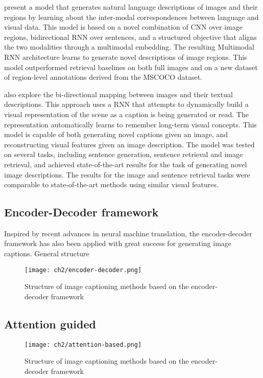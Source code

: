 \citet{Karpathy2015} present a model that generates natural language descriptions of images and their regions by learning about the inter-modal correspondences between language and visual data. This model is based on a novel combination of CNN over image regions, bidirectional RNN over sentences, and a structured objective that aligns the two modalities through a multimodal embedding. The resulting Multimodal RNN architecture learns to generate novel descriptions of image regions. This model outperformed retrieval baselines on both full images and on a new dataset of region-level annotations derived from the MSCOCO dataset.
 
\citet{Chen2015} also explore the bi-directional mapping between images and their textual descriptions. This approach uses a RNN that attempts to dynamically build a visual representation of the scene as a caption is being generated or read. The representation automatically learns to remember long-term visual concepts. This model is capable of both generating novel captions given an image, and reconstructing visual features given an image description. The model was tested on several tasks, including sentence generation, sentence retrieval and image retrieval, and achieved state-of-the-art results for the task of generating novel image descriptions. The results for the image and sentence retrieval tasks were comparable to state-of-the-art methods using similar visual features.

\subsection{Encoder-Decoder framework}

Inspired by recent advances in neural machine translation, the encoder-decoder framework has also been applied with great success for generating image captions. General structure

\begin{figure}[hpt]
	\centering
	\texttt{[image: ch2/encoder-decoder.png]}
	\caption{Structure of image captioning methods based on the encoder-decoder framework}
	\label{fig:encoder-decoder}
\end{figure}

\subsection{Attention guided}

\begin{figure}[hpt]
	\centering
	\texttt{[image: ch2/attention-based.png]}
	\caption{Structure of image captioning methods based on the encoder-decoder framework}
	\label{fig:attention-based}
\end{figure}

